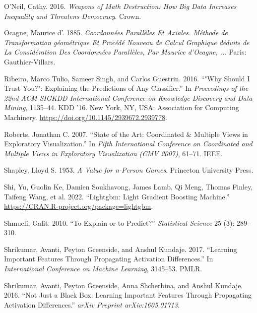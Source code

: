 \documentclass[11pt,twoside]{article}
\newlength{\cslhangindent}
\newlength{\cslentryspacingunit} %
\newenvironment{CSLReferences}[2] %
 {%
  \setlength{\parindent}{0pt}
  \ifodd #1
  \let\oldpar\par
  \def\par{\hangindent=\cslhangindent\oldpar}
  \fi
  \setlength{\parskip}{#2\cslentryspacingunit}
 }%
 {}
\begin{document}
\begin{CSLReferences}{1}{0}
\leavevmode\hypertarget{ref-oneil_weapons_2016}{}%
O'Neil, Cathy. 2016. \emph{Weapons of Math Destruction: {How} Big Data Increases Inequality and Threatens Democracy}. Crown.

\leavevmode\hypertarget{ref-ocagne_coordonnees_1885}{}%
Ocagne, Maurice d'. 1885. \emph{Coordonnées Parallèles Et Axiales. {Méthode} de Transformation géométrique Et Procédé Nouveau de Calcul Graphique déduits de La Considération Des Coordonnées Parallèles, Par {Maurice} d'{Ocagne}, ...} Paris: Gauthier-Villars.

\leavevmode\hypertarget{ref-ribeiro_why_2016}{}%
Ribeiro, Marco Tulio, Sameer Singh, and Carlos Guestrin. 2016. {``"{Why} {Should} {I} {Trust} {You}?": {Explaining} the {Predictions} of {Any} {Classifier}.''} In \emph{Proceedings of the 22nd {ACM} {SIGKDD} {International} {Conference} on {Knowledge} {Discovery} and {Data} {Mining}}, 1135--44. {KDD} '16. New York, NY, USA: Association for Computing Machinery. \url{https://doi.org/10.1145/2939672.2939778}.

\leavevmode\hypertarget{ref-roberts_state_2007}{}%
Roberts, Jonathan C. 2007. {``State of the Art: {Coordinated} \& Multiple Views in Exploratory Visualization.''} In \emph{Fifth International Conference on Coordinated and Multiple Views in Exploratory Visualization ({CMV} 2007)}, 61--71. IEEE.

\leavevmode\hypertarget{ref-shapley_value_1953}{}%
Shapley, Lloyd S. 1953. \emph{A Value for n-Person Games}. Princeton University Press.

\leavevmode\hypertarget{ref-shi_lightgbm_2022}{}%
Shi, Yu, Guolin Ke, Damien Soukhavong, James Lamb, Qi Meng, Thomas Finley, Taifeng Wang, et al. 2022. {``Lightgbm: {Light} {Gradient} {Boosting} {Machine}.''} \url{https://CRAN.R-project.org/package=lightgbm}.

\leavevmode\hypertarget{ref-shmueli_explain_2010}{}%
Shmueli, Galit. 2010. {``To Explain or to Predict?''} \emph{Statistical Science} 25 (3): 289--310.

\leavevmode\hypertarget{ref-shrikumar_learning_2017}{}%
Shrikumar, Avanti, Peyton Greenside, and Anshul Kundaje. 2017. {``Learning Important Features Through Propagating Activation Differences.''} In \emph{International {Conference} on {Machine} {Learning}}, 3145--53. PMLR.

\leavevmode\hypertarget{ref-shrikumar_not_2016}{}%
Shrikumar, Avanti, Peyton Greenside, Anna Shcherbina, and Anshul Kundaje. 2016. {``Not Just a Black Box: {Learning} Important Features Through Propagating Activation Differences.''} \emph{arXiv Preprint arXiv:1605.01713}.


\end{CSLReferences}
\end{document}
